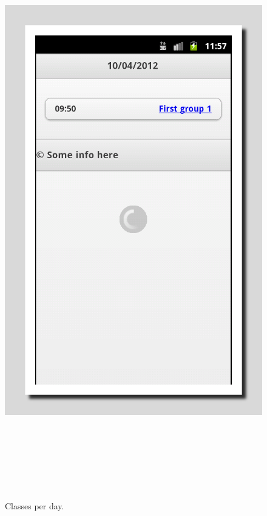 \documentclass[a4paper]{article}
\begin{document}
\begin{enumerate}
\begin{enumerate}
\begin{figure}
\end{figure}
\clearpage

\begin{figure}
\centering
\includegraphics[width=15.73cm,height=25.019cm]{PhoneGapProjectMSWLMemory-img/PhoneGapProjectMSWLMemory-img9.png}
\caption[Classes per day.]{Classes per day.}

\end{figure}
\clearpage


\end{enumerate}
\end{enumerate}
\end{document}
